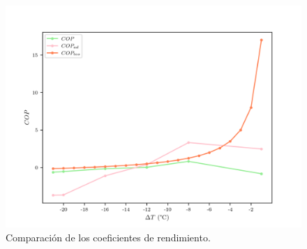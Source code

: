 \begin{figure}[ht]
    \centering
    \includegraphics[width = 0.8\linewidth]{img/refri_cops.png}
    \caption{Comparación de los coeficientes de rendimiento.}
    \label{fig:refri_cops}
\end{figure}

